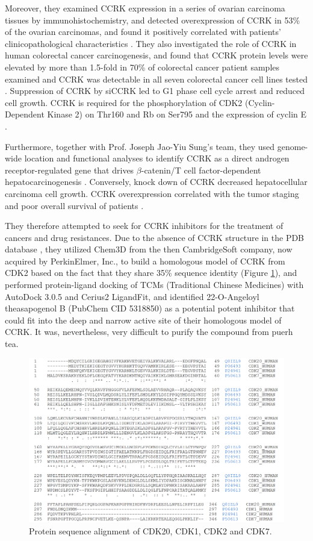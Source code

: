 Moreover, they examined CCRK expression in a series of ovarian carcinoma tissues by immunohistochemistry, and detected overexpression of CCRK in 53\% of the ovarian carcinomas, and found it positively correlated with patients' clinicopathological characteristics \citep{1145}. They also investigated the role of CCRK in human colorectal cancer carcinogenesis, and found that CCRK protein levels were elevated by more than 1.5-fold in 70\% of colorectal cancer patient samples examined and CCRK was detectable in all seven colorectal cancer cell lines tested \citep{1143}. Suppression of CCRK by siCCRK led to G1 phase cell cycle arrest and reduced cell growth. CCRK is required for the phosphorylation of CDK2 (Cyclin-Dependent Kinase 2) on Thr160 and Rb on Ser795 and the expression of cyclin E \citep{1143}. 

Furthermore, together with Prof. Joseph Jao-Yiu Sung's team, they used genome-wide location and functional analyses to identify CCRK as a direct androgen receptor-regulated gene that drives $\beta$-catenin/T cell factor-dependent hepatocarcinogenesis \citep{1146}. Conversely, knock down of CCRK decreased hepatocellular carcinoma cell growth. CCRK overexpression correlated with the tumor staging and poor overall survival of patients \citep{1146}.

They therefore attempted to seek for CCRK inhibitors for the treatment of cancers and drug resistances. Due to the absence of CCRK structure in the PDB database \citep{540,537}, they utilized Chem3D from the then CambridgeSoft company, now acquired by PerkinElmer, Inc., to build a homologous model of CCRK from CDK2 based on the fact that they share 35\% sequence identity (Figure \ref{Case:CDKAlignment}), and performed protein-ligand docking of TCMs (Traditional Chinese Medicines) with AutoDock 3.0.5 and Cerius2 LigandFit, and identified 22-O-Angeloyl theasapogenol B (PubChem CID 5318850) as a potential potent inhibitor that could fit into the deep and narrow active site of their homologous model of CCRK. It was, nevertheless, very difficult to purify the compound from puerh tea.

\begin{figure}
\centering
\includegraphics[width=\linewidth]{../ccrk/CDKAlignment.png}
\caption{Protein sequence alignment of CDK20, CDK1, CDK2 and CDK7.}
\label{Case:CDKAlignment}
\end{figure}

